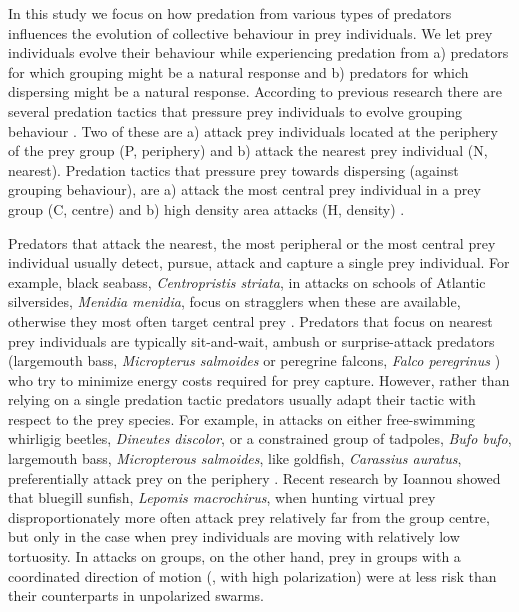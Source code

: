In this study we focus on how predation from various types of predators influences the evolution of collective behaviour in prey individuals. We let prey individuals evolve their behaviour while experiencing predation from a) predators for which grouping might be a natural response and b) predators for which dispersing might be a natural response. According to previous research there are several predation tactics that pressure prey individuals to evolve grouping behaviour \cite{biswas2014causes,kunz2006prey,olson2013predator,olson2016evolution}. Two of these are a) attack prey individuals located at the periphery of the prey group (P, periphery) and b) attack the nearest prey individual (N, nearest). Predation tactics that pressure prey towards dispersing (against grouping behaviour), are a) attack the most central prey individual in a prey group (C, centre) and b) high density area attacks (H, density) \cite{olson2013predator}. 

Predators that attack the nearest, the most peripheral or the most central prey individual usually detect, pursue, attack and capture a single prey individual. For example, black seabass, \emph{Centropristis striata}, in attacks on schools of Atlantic silversides, \emph{Menidia menidia}, focus on stragglers when these are available, otherwise they most often target central prey \cite{parrish1989reexamining}. Predators that focus on nearest prey individuals are typically sit-and-wait, ambush or surprise-attack predators (\eg largemouth bass, \emph{Micropterus salmoides} \cite{savino1982predatorprey} or peregrine falcons, \emph{Falco peregrinus} \cite{zoratto2010aerial}) who try to minimize energy costs required for prey capture. However, rather than relying on a single predation tactic predators usually adapt their tactic with respect to the prey species. For example, in attacks on either free-swimming whirligig beetles, \emph{Dineutes discolor}, or a constrained group of tadpoles, \emph{Bufo bufo}, largemouth bass, \emph{Micropterous salmoides}, like goldfish, \emph{Carassius auratus}, preferentially attack prey on the periphery \cite{romey2008predators}. Recent research by Ioannou\etal \cite{ioannou2012predatory} showed that bluegill sunfish, \emph{Lepomis macrochirus}, when hunting virtual prey disproportionately more often attack prey relatively far from the group centre, but only in the case when prey individuals are moving with relatively low tortuosity. In attacks on groups, on the other hand, prey in groups with a coordinated direction of motion (\ie, with high polarization) were at less risk than their counterparts in unpolarized swarms.

